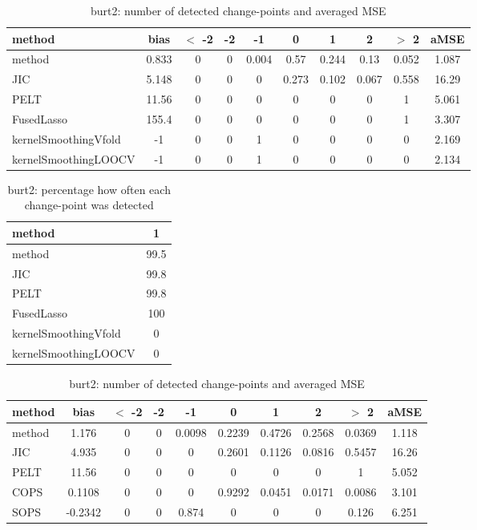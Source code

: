 \begin{table}[ht]
\centering
\begin{tabular}{l|c|ccccccc|c}
  \hline
method & bias & $<$ -2 & -2 & -1 & 0 & 1 & 2 & $>$ 2 & aMSE \\ 
  \hline
method & 0.833 &     0 &     0 & 0.004 &  0.57 & 0.244 &  0.13 & 0.052 & 1.087 \\ 
  JIC & 5.148 &     0 &     0 &     0 & 0.273 & 0.102 & 0.067 & 0.558 & 16.29 \\ 
  PELT & 11.56 &     0 &     0 &     0 &     0 &     0 &     0 &     1 & 5.061 \\ 
  FusedLasso & 155.4 &     0 &     0 &     0 &     0 &     0 &     0 &     1 & 3.307 \\ 
  kernelSmoothingVfold &    -1 &     0 &     0 &     1 &     0 &     0 &     0 &     0 & 2.169 \\ 
  kernelSmoothingLOOCV &    -1 &     0 &     0 &     1 &     0 &     0 &     0 &     0 & 2.134 \\ 
   \hline
\end{tabular}
\caption{burt2: number of detected change-points and averaged MSE} 
\label{tab:burt2Njumps}
\end{table}
\begin{table}[ht]
\centering
\begin{tabular}{l|c}
  \hline
method & 1 \\ 
  \hline
method &   99.5 \\ 
  JIC &   99.8 \\ 
  PELT &   99.8 \\ 
  FusedLasso &    100 \\ 
  kernelSmoothingVfold &      0 \\ 
  kernelSmoothingLOOCV &      0 \\ 
   \hline
\end{tabular}
\caption{burt2: percentage how often each change-point was detected} 
\label{tab:burt2Detections}
\end{table}
\begin{table}[ht]
\centering
\begin{tabular}{l|c|ccccccc|c}
  \hline
method & bias & $<$ -2 & -2 & -1 & 0 & 1 & 2 & $>$ 2 & aMSE \\ 
  \hline
method & 1.176 &     0 &     0 & 0.0098 & 0.2239 & 0.4726 & 0.2568 & 0.0369 & 1.118 \\ 
  JIC & 4.935 &     0 &     0 &     0 & 0.2601 & 0.1126 & 0.0816 & 0.5457 & 16.26 \\ 
  PELT & 11.56 &     0 &     0 &     0 &     0 &     0 &     0 &     1 & 5.052 \\ 
  COPS & 0.1108 &     0 &     0 &     0 & 0.9292 & 0.0451 & 0.0171 & 0.0086 & 3.101 \\ 
  SOPS & -0.2342 &     0 &     0 & 0.874 &     0 &     0 &     0 & 0.126 & 6.251 \\ 
   \hline
\end{tabular}
\caption{burt2: number of detected change-points and averaged MSE} 
\label{tab:burt2Njumps}
\end{table}
